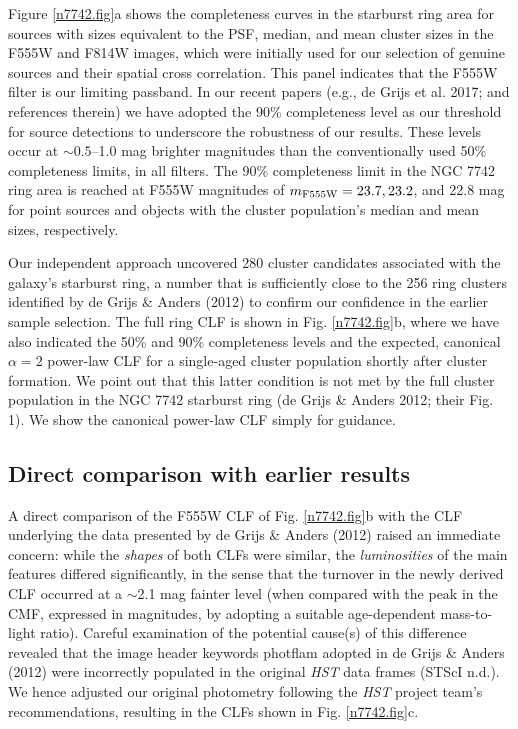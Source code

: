 \documentclass{raa}            %
\begin{document}
Figure \ref{n7742.fig}a shows the completeness curves in the starburst
ring area for sources with sizes equivalent to the PSF, median, and
mean cluster sizes in the F555W and F814W images, which were initially
used for our selection of genuine sources and their spatial cross
correlation. This panel indicates that the F555W filter is our
limiting passband. In our recent papers (e.g., de Grijs et al. 2017;
and references therein) we have adopted the 90\% completeness level as
our threshold for source detections to underscore the robustness of
our results. These levels occur at $\sim 0.5$--1.0 mag brighter
magnitudes than the conventionally used 50\% completeness limits, in
all filters. The 90\% completeness limit in the NGC 7742 ring area is
reached at F555W magnitudes of $m_{\rm F555W} = 23.7, 23.2$, and 22.8
mag for point sources and objects with the cluster population's median
and mean sizes, respectively.

Our independent approach uncovered 280 cluster candidates associated
with the galaxy's starburst ring, a number that is sufficiently close
to the 256 ring clusters identified by de Grijs \& Anders (2012) to
confirm our confidence in the earlier sample selection. The full ring
CLF is shown in Fig. \ref{n7742.fig}b, where we have also indicated
the 50\% and 90\% completeness levels and the expected, canonical
$\alpha = 2$ power-law CLF for a single-aged cluster population
shortly after cluster formation. We point out that this latter
condition is not met by the full cluster population in the NGC 7742
starburst ring (de Grijs \& Anders 2012; their Fig. 1). We show the
canonical power-law CLF simply for guidance.

\subsection{Direct comparison with earlier results}

A direct comparison of the F555W CLF of Fig. \ref{n7742.fig}b with the
CLF underlying the data presented by de Grijs \& Anders (2012) raised
an immediate concern: while the {\it shapes} of both CLFs were
similar, the {\it luminosities} of the main features differed
significantly, in the sense that the turnover in the newly derived CLF
occurred at a $\sim$2.1 mag fainter level (when compared with the peak
in the CMF, expressed in magnitudes, by adopting a suitable
age-dependent mass-to-light ratio). Careful examination of the
potential cause(s) of this difference revealed that the image header
keywords {\sc photflam} adopted in de Grijs \& Anders (2012) were
incorrectly populated in the original {\sl HST} data frames (STScI
n.d.). We hence adjusted our original photometry following the {\sl
  HST} project team's recommendations, resulting in the CLFs shown in
Fig. \ref{n7742.fig}c.
\end{document}
